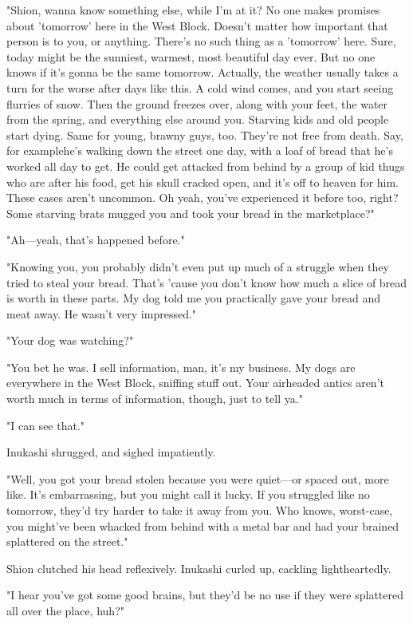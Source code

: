 "Shion, wanna know something else, while I'm at it? No one makes
promises about 'tomorrow' here in the West Block. Doesn't matter how
important that person is to you, or anything. There's no such thing as a
'tomorrow' here. Sure, today might be the sunniest, warmest, most
beautiful day ever. But no one knows if it's gonna be the same tomorrow.
Actually, the weather usually takes a turn for the worse after days like
this. A cold wind comes, and you start seeing flurries of snow. Then the
ground freezes over, along with your feet, the water from the spring,
and everything else around you. Starving kids and old people start
dying. Same for young, brawny guys, too. They're not free from death.
Say, for example\el he's walking down the street one day, with a loaf of
bread that he's worked all day to get. He could get attacked from behind
by a group of kid thugs who are after his food, get his skull cracked
open, and it's off to heaven for him. These cases aren't uncommon. Oh
yeah, you've experienced it before too, right? Some starving brats
mugged you and took your bread in the marketplace?"

"Ah---yeah, that's happened before."

"Knowing you, you probably didn't even put up much of a struggle when
they tried to steal your bread. That's 'cause you don't know how much a
slice of bread is worth in these parts. My dog told me you practically
gave your bread and meat away. He wasn't very impressed."

"Your dog was watching?"

"You bet he was. I sell information, man, it's my business. My dogs are
everywhere in the West Block, sniffing stuff out. Your airheaded antics
aren't worth much in terms of information, though, just to tell ya."

"I can see that."

Inukashi shrugged, and sighed impatiently.

"Well, you got your bread stolen because you were quiet---or spaced out,
more like. It's embarrassing, but you might call it lucky. If you
struggled like no tomorrow, they'd try harder to take it away from you.
Who knows, worst-case, you might've been whacked from behind with a
metal bar and had your brained splattered on the street."

Shion clutched his head reflexively. Inukashi curled up, cackling
lightheartedly.

"I hear you've got some good brains, but they'd be no use if they were
splattered all over the place, huh?"

